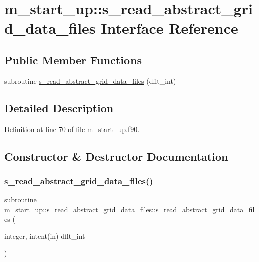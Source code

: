 \hypertarget{interfacem__start__up_1_1s__read__abstract__grid__data__files}{}\section{m\+\_\+start\+\_\+up\+:\+:s\+\_\+read\+\_\+abstract\+\_\+grid\+\_\+data\+\_\+files Interface Reference}
\label{interfacem__start__up_1_1s__read__abstract__grid__data__files}
\subsection*{Public Member Functions}
\begin{DoxyCompactItemize}
\item 
subroutine \hyperlink{interfacem__start__up_1_1s__read__abstract__grid__data__files_ac3b8ebf2b8546cbb818f3f68b4f3695e}{s\+\_\+read\+\_\+abstract\+\_\+grid\+\_\+data\+\_\+files} (dflt\+\_\+int)
\end{DoxyCompactItemize}


\subsection{Detailed Description}


Definition at line 70 of file m\+\_\+start\+\_\+up.\+f90.



\subsection{Constructor \& Destructor Documentation}
\mbox{\label{interfacem__start__up_1_1s__read__abstract__grid__data__files_ac3b8ebf2b8546cbb818f3f68b4f3695e}} 
\subsubsection{\texorpdfstring{s\+\_\+read\+\_\+abstract\+\_\+grid\+\_\+data\+\_\+files()}{s\_read\_abstract\_grid\_data\_files()}}
{\footnotesize\ttfamily subroutine m\+\_\+start\+\_\+up\+::s\+\_\+read\+\_\+abstract\+\_\+grid\+\_\+data\+\_\+files\+::s\+\_\+read\+\_\+abstract\+\_\+grid\+\_\+data\+\_\+files (\begin{DoxyParamCaption}\item[{integer, intent(in)}]{dflt\+\_\+int }\end{DoxyParamCaption})}



